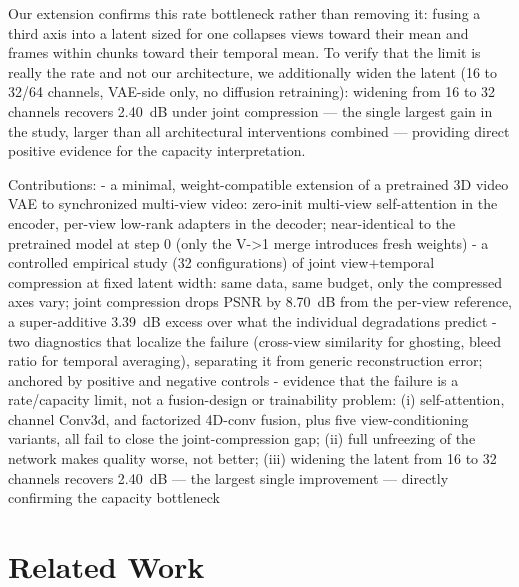 Our extension confirms this rate bottleneck rather than removing it: fusing a third axis into a latent sized for one collapses views toward their mean and frames within chunks toward their temporal mean. To verify that the limit is really the rate and not our architecture, we additionally widen the latent (16 to 32/64 channels, VAE-side only, no diffusion retraining): widening from 16 to 32 channels recovers 2.40~dB under joint compression --- the single largest gain in the study, larger than all architectural interventions combined --- providing direct positive evidence for the capacity interpretation.

Contributions:
- a minimal, weight-compatible extension of a pretrained 3D video VAE to synchronized multi-view video: zero-init multi-view self-attention in the encoder, per-view low-rank adapters in the decoder; near-identical to the pretrained model at step 0 (only the V->1 merge introduces fresh weights)
- a controlled empirical study (32 configurations) of joint view+temporal compression at fixed latent width: same data, same budget, only the compressed axes vary; joint compression drops PSNR by 8.70~dB from the per-view reference, a super-additive 3.39~dB excess over what the individual degradations predict
- two diagnostics that localize the failure (cross-view similarity for ghosting, bleed ratio for temporal averaging), separating it from generic reconstruction error; anchored by positive and negative controls
- evidence that the failure is a rate/capacity limit, not a fusion-design or trainability problem: (i) self-attention, channel Conv3d, and factorized 4D-conv fusion, plus five view-conditioning variants, all fail to close the joint-compression gap; (ii) full unfreezing of the network makes quality worse, not better; (iii) widening the latent from 16 to 32 channels recovers 2.40~dB --- the largest single improvement --- directly confirming the capacity bottleneck


\section{Related Work}


